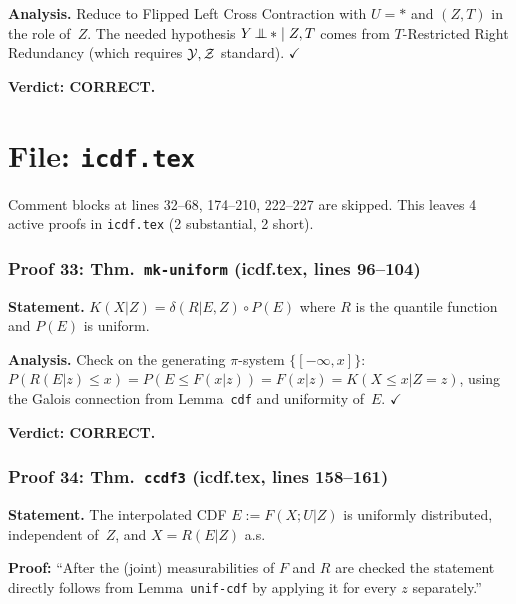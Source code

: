 \documentclass{article}
\begin{document}
\textbf{Analysis.}
Reduce to Flipped Left Cross Contraction with $U=*$ and $(Z,T)$ in the role
of~$Z$.  The needed hypothesis $Y\operatorname*{\perp\mkern-11mu\perp} *\mid Z,T$ comes from $T$-Restricted
Right Redundancy (which requires $\mathcal{Y},\mathcal{Z}$ standard).  $\checkmark$

\textbf{Verdict: CORRECT.}

\part*{File: \texttt{icdf.tex}}

Comment blocks at lines 32--68, 174--210, 222--227 are skipped.
This leaves 4 active proofs in \texttt{icdf.tex} (2 substantial, 2 short).

\section{Proof 33: Thm.\ \texttt{mk-uniform} (icdf.tex, lines 96--104)}

\textbf{Statement.} $K(X|Z) = \delta(R|E,Z)\circ P(E)$ where $R$ is the quantile
function and $P(E)$ is uniform.

\textbf{Analysis.}
Check on the generating $\pi$-system $\{[-\infty,x]\}$:
$P(R(E|z)\le x) = P(E\le F(x|z)) = F(x|z) = K(X\le x|Z=z)$,
using the Galois connection from Lemma~\texttt{cdf} and uniformity of~$E$.  $\checkmark$

\textbf{Verdict: CORRECT.}

\section{Proof 34: Thm.\ \texttt{ccdf3} (icdf.tex, lines 158--161)}

\textbf{Statement.} The interpolated CDF $E:=F(X;U|Z)$ is uniformly distributed,
independent of~$Z$, and $X=R(E|Z)$ a.s.

\textbf{Proof:} ``After the (joint) measurabilities of $F$ and $R$ are checked the
statement directly follows from Lemma~\texttt{unif-cdf} by applying it for every
$z$ separately.''
\end{document}

